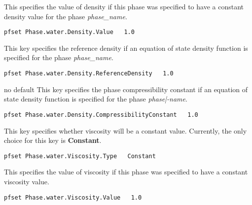 {This specifies the value of density if this phase was specified to have a
constant density value for the phase {\em phase\_name}.}
\begin{display}\begin{verbatim}
pfset Phase.water.Density.Value   1.0
\end{verbatim}\end{display}

{This key specifies the reference density if an equation of state density
function is specified for the phase {\em phase\_name}.}
\begin{display}\begin{verbatim}
pfset Phase.water.Density.ReferenceDensity   1.0
\end{verbatim}\end{display}

{no default}
{This key specifies the phase compressibility constant 
if an equation of state density function is specified for the phase
{\em phase|-name}.}
\begin{display}\begin{verbatim}
pfset Phase.water.Density.CompressibilityConstant   1.0
\end{verbatim}\end{display}

{This key specifies whether viscosity will be a constant value.
Currently, the only choice for this key is {\bf Constant}.}
\begin{display}\begin{verbatim}
pfset Phase.water.Viscosity.Type   Constant
\end{verbatim}\end{display}

{This specifies the value of viscosity if this phase was specified to have a
constant viscosity value.}
\begin{display}\begin{verbatim}
pfset Phase.water.Viscosity.Value   1.0
\end{verbatim}\end{display}


